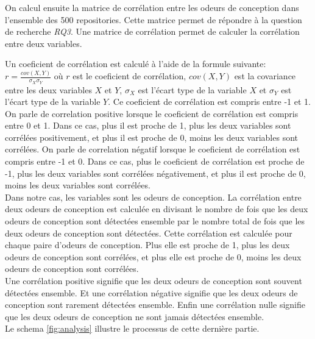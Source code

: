 On calcul ensuite la matrice de corrélation entre les odeurs de conception dans
l'ensemble des 500 repositories. Cette matrice permet de répondre à la question
de recherche \emph{RQ3}. Une matrice de corrélation permet
de calculer la corrélation entre deux variables.

Un coeficient de corrélation est calculé à l'aide de la formule suivante:  $r =
  \frac{cov(X,Y)}{\sigma_X \sigma_Y}$  où $r$ est le coeficient de corrélation, $cov(X,Y)$ est la covariance entre les
deux variables $X$ et $Y$, $\sigma_X$ est l'écart type de la variable $X$ et
$\sigma_Y$ est l'écart type de la variable $Y$. Ce coeficient de corrélation est
compris entre -1 et 1. On parle de correlation positive lorsque le coeficient de
corrélation est compris entre 0 et 1. Dans ce cas, plus il est proche de 1, plus les deux variables sont
corrélées positivement, et plus il est proche de 0, moins les deux variables sont
corrélées. On parle de correlation négatif lorsque le coeficient de corrélation
est compris entre -1 et 0. Dans ce cas, plus le coeficient de corrélation est
proche de -1, plus les deux variables sont corrélées négativement, et plus il
est proche de 0, moins les deux variables sont corrélées.\\



Dans notre cas, les variables sont les odeurs de conception. La corrélation entre deux odeurs de conception est
calculée en divisant le nombre de fois que les deux odeurs de conception sont
détectées ensemble par le nombre total de fois que les deux odeurs de conception
sont détectées. Cette corrélation est calculée pour chaque paire d'odeurs de
conception. Plus elle est proche de 1, plus les deux odeurs de conception sont
corrélées, et plus elle est proche de 0, moins les deux odeurs de conception
sont corrélées.\\

Une corrélation positive signifie que les deux odeurs de conception
sont souvent détectées ensemble. Et une corrélation négative signifie que les deux odeurs de conception sont rarement
détectées ensemble. Enfin une corrélation nulle signifie que les deux odeurs de
conception ne sont jamais détectées ensemble.\\

Le schema \ref{fig:analysis} illustre le processus de cette dernière partie.\\

